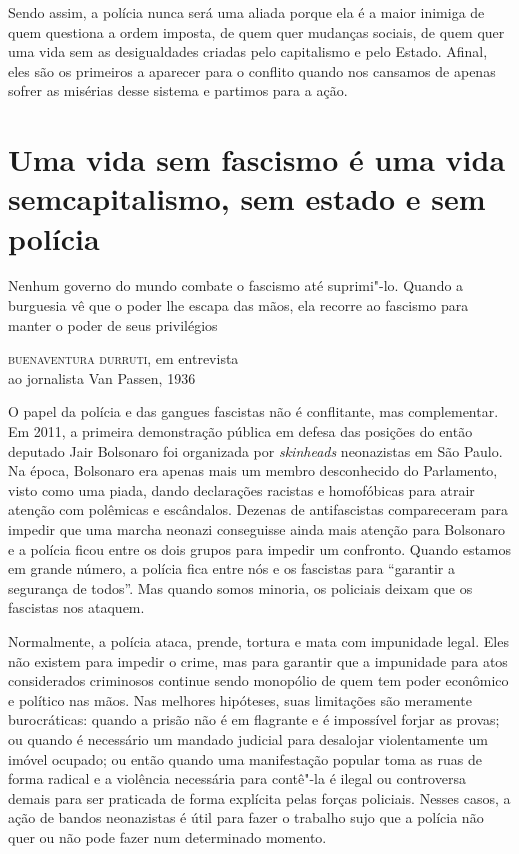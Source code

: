 Sendo assim, a polícia nunca será uma aliada porque ela é a maior inimiga de quem questiona a ordem imposta, de quem quer mudanças sociais, de quem quer uma vida sem as desigualdades criadas pelo capitalismo e pelo Estado. Afinal, eles são os primeiros a aparecer para o conflito quando nos cansamos de apenas sofrer as misérias desse sistema e partimos para a ação.

\section{Uma vida sem fascismo é uma vida sem\break capitalismo, sem estado e sem polícia}

\epigraph{Nenhum governo do mundo combate o fascismo até suprimi"-lo. Quando a burguesia vê que o poder lhe escapa das mãos, ela recorre ao fascismo para manter o poder de seus privilégios}{\textsc{buenaventura durruti}, em entrevista\\ ao jornalista Van Passen, 1936}

O papel da polícia e das gangues fascistas não é conflitante, mas complementar. Em 2011, a primeira demonstração pública em defesa das posições do então deputado Jair Bolsonaro foi organizada por \emph{skinheads} neonazistas em São Paulo. Na época, Bolsonaro era apenas mais um membro desconhecido do Parlamento, visto como uma piada, dando declarações racistas e homofóbicas para atrair atenção com polêmicas e escândalos. Dezenas de antifascistas compareceram para impedir que uma marcha neonazi conseguisse ainda mais atenção para Bolsonaro e a polícia ficou entre os dois grupos para impedir um confronto. Quando estamos em grande número, a polícia fica entre nós e os fascistas para ``garantir a segurança de todos''. Mas quando somos minoria, os policiais deixam que os fascistas nos ataquem.

Normalmente, a polícia ataca, prende, tortura e mata com impunidade legal. Eles não existem para impedir o crime, mas para garantir que a impunidade para atos considerados criminosos continue sendo monopólio de quem tem poder econômico e político nas mãos. Nas melhores hipóteses, suas limitações são meramente burocráticas: quando a prisão não é em flagrante e é impossível forjar as provas; ou quando é necessário um mandado judicial para desalojar violentamente um imóvel ocupado; ou então quando uma manifestação popular toma as ruas de forma radical e a violência necessária para contê"-la é ilegal ou controversa demais para ser praticada de forma explícita pelas forças policiais. Nesses casos, a ação de bandos neonazistas é útil para fazer o trabalho sujo que a polícia não quer ou não pode fazer num determinado momento.

